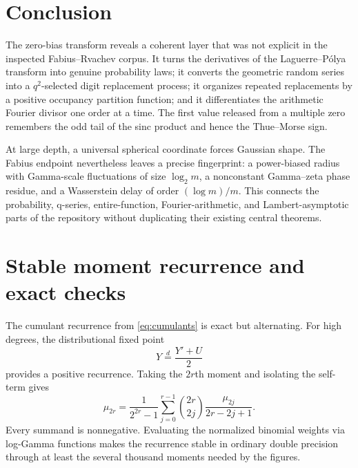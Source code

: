 \documentclass[11pt,oneside]{article}
\theoremstyle{definition}
\theoremstyle{remark}
\begin{document}
\section{Conclusion}

The zero-bias transform reveals a coherent layer that was not explicit in the
inspected Fabius--Rvachev corpus.  It turns the derivatives of the
Laguerre--P\'olya transform into genuine probability laws; it converts the
geometric random series into a $q^2$-selected digit replacement process; it
organizes repeated replacements by a positive occupancy partition function;
and it differentiates the arithmetic Fourier divisor one order at a time.
The first value released from a multiple zero remembers the odd tail of the
sinc product and hence the Thue--Morse sign.

At large depth, a universal spherical coordinate forces Gaussian shape.  The
Fabius endpoint nevertheless leaves a precise fingerprint: a power-biased
radius with Gamma-scale fluctuations of size $\log_2m$, a nonconstant
Gamma--zeta phase residue, and a Wasserstein delay of order $(\log m)/m$.
This connects the probability, q-series, entire-function, Fourier-arithmetic,
and Lambert-asymptotic parts of the repository without duplicating their
existing central theorems.

\appendix

\section{Stable moment recurrence and exact checks}
\label{app:numerics}

The cumulant recurrence from \eqref{eq:cumulants} is exact but alternating.
For high degrees, the distributional fixed point
\begin{equation}
 Y\stackrel d=\frac{Y'+U}{2}                        \label{eq:Y-fixed-point}
\end{equation}
provides a positive recurrence.  Taking the $2r$th moment and isolating the
self-term gives
\begin{equation}
 \boxed{
 \mu_{2r}
 =\frac{1}{2^{2r}-1}
  \sum_{j=0}^{r-1}
  \binom{2r}{2j}\frac{\mu_{2j}}{2r-2j+1}.}          \label{eq:positive-moment-recurrence}
\end{equation}
Every summand is nonnegative.  Evaluating the normalized binomial weights via
log-Gamma functions makes the recurrence stable in ordinary double precision
through at least the several thousand moments needed by the figures.
\end{document}
